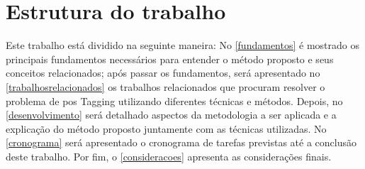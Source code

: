 


\section{Estrutura do trabalho}\label{sec:estruturadotrabalho}

Este trabalho está dividido na seguinte maneira: No \autoref{fundamentos} é mostrado os principais fundamentos necessários para entender o método proposto e seus conceitos relacionados; após passar os fundamentos, será apresentado no \autoref{trabalhosrelacionados} os trabalhos relacionados que procuram resolver o problema de \ac{pos} Tagging utilizando diferentes técnicas e métodos. Depois, no \autoref{desenvolvimento} será detalhado aspectos da metodologia a ser aplicada e a explicação do método proposto juntamente com as técnicas utilizadas. No \autoref{cronograma} será apresentado o cronograma de tarefas previstas até a conclusão deste trabalho. Por fim, o \autoref{consideracoes} apresenta as considerações finais.
